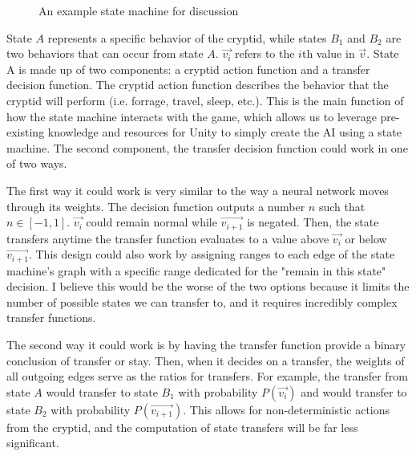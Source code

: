 \begin{figure}
\caption{An example state machine for discussion}
\label{fig:state1}
\end{figure}

State $A$ represents a specific behavior of the cryptid, while states $B_1$ and $B_2$ are two behaviors that can occur from state $A$. $\vec{v_i}$ refers to the $i$th value in $\vec{v}$. State A is made up of two components: a cryptid action function and a transfer decision function. The cryptid action function describes the behavior that the cryptid will perform (i.e. forrage, travel, sleep, etc.). This is the main function of how the state machine interacts with the game, which allows us to leverage pre-existing knowledge and resources for Unity to simply create the AI using a state machine. The second component, the transfer decision function could work in one of two ways.

The first way it could work is very similar to the way a neural network moves through its weights. The decision function outputs a number $n$ such that $n \in [-1, 1]$. $\vec{v_i}$ could remain normal while $\vec{v_{i+1}}$ is negated. Then, the state transfers anytime the transfer function evaluates to a value above $\vec{v_i}$ or below $\vec{v_{i+1}}$. This design could also work by assigning ranges to each edge of the state machine's graph with a specific range dedicated for the "remain in this state" decision. I believe this would be the worse of the two options because it limits the number of possible states we can transfer to, and it requires incredibly complex transfer functions.

The second way it could work is by having the transfer function provide a binary conclusion of transfer or stay. Then, when it decides on a transfer, the weights of all outgoing edges serve as the ratios for transfers. For example, the transfer from state $A$ would transfer to state $B_1$ with probability $P(\vec{v_i})$ and would transfer to state $B_2$ with probability $P(\vec{v_{i+1}})$. This allows for non-deterministic actions from the cryptid, and the computation of state transfers will be far less significant.

